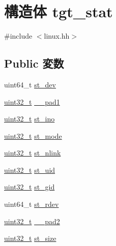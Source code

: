 \hypertarget{structPowerLinux_1_1tgt__stat}{
\section{構造体 tgt\_\-stat}
\label{structPowerLinux_1_1tgt__stat}
}


{\ttfamily \#include $<$linux.hh$>$}\subsection*{Public 変数}
\begin{DoxyCompactItemize}
\item 
uint64\_\-t \hyperlink{structPowerLinux_1_1tgt__stat_a0146849d3da5c91d9776888b14b82dcc}{st\_\-dev}
\item 
\hyperlink{Type_8hh_a435d1572bf3f880d55459d9805097f62}{uint32\_\-t} \hyperlink{structPowerLinux_1_1tgt__stat_a95858c04e3640c0e2df56262dcadb875}{\_\-\_\-pad1}
\item 
\hyperlink{Type_8hh_a435d1572bf3f880d55459d9805097f62}{uint32\_\-t} \hyperlink{structPowerLinux_1_1tgt__stat_a30ef9dc767fe6e3dca64f8fbf71af690}{st\_\-ino}
\item 
\hyperlink{Type_8hh_a435d1572bf3f880d55459d9805097f62}{uint32\_\-t} \hyperlink{structPowerLinux_1_1tgt__stat_a75f55d064ed3b380b0315de36e178885}{st\_\-mode}
\item 
\hyperlink{Type_8hh_a435d1572bf3f880d55459d9805097f62}{uint32\_\-t} \hyperlink{structPowerLinux_1_1tgt__stat_ab77c257c135fa586e930ef0bf0977c08}{st\_\-nlink}
\item 
\hyperlink{Type_8hh_a435d1572bf3f880d55459d9805097f62}{uint32\_\-t} \hyperlink{structPowerLinux_1_1tgt__stat_ad5477a292a4edf27aa5766e01e0f5d1f}{st\_\-uid}
\item 
\hyperlink{Type_8hh_a435d1572bf3f880d55459d9805097f62}{uint32\_\-t} \hyperlink{structPowerLinux_1_1tgt__stat_a1faa6012541b83fd5218e2b229f876ec}{st\_\-gid}
\item 
uint64\_\-t \hyperlink{structPowerLinux_1_1tgt__stat_ac430407fd3b0e421da1ee8f66c95a786}{st\_\-rdev}
\item 
\hyperlink{Type_8hh_a435d1572bf3f880d55459d9805097f62}{uint32\_\-t} \hyperlink{structPowerLinux_1_1tgt__stat_a028000613311d94d99bc2de4cab4b30b}{\_\-\_\-pad2}
\item 
\hyperlink{Type_8hh_a435d1572bf3f880d55459d9805097f62}{uint32\_\-t} \hyperlink{structPowerLinux_1_1tgt__stat_a0b83ab57b8d5de04bad49c03958fd7d7}{st\_\-size}
\item 

\end{DoxyCompactItemize}

